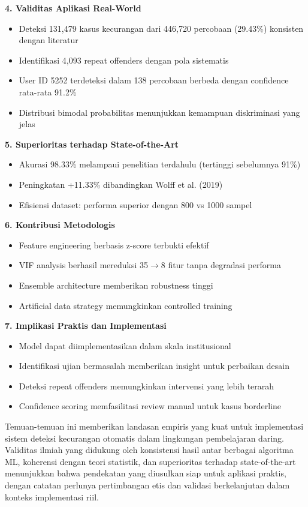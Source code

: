 \textbf{4. Validitas Aplikasi Real-World}
\begin{itemize}
    \item Deteksi 131,479 kasus kecurangan dari 446,720 percobaan (29.43\%) konsisten dengan literatur
    \item Identifikasi 4,093 repeat offenders dengan pola sistematis
    \item User ID 5252 terdeteksi dalam 138 percobaan berbeda dengan confidence rata-rata 91.2\%
    \item Distribusi bimodal probabilitas menunjukkan kemampuan diskriminasi yang jelas
\end{itemize}

\textbf{5. Superioritas terhadap State-of-the-Art}
\begin{itemize}
    \item Akurasi 98.33\% melampaui penelitian terdahulu (tertinggi sebelumnya 91\%)
    \item Peningkatan +11.33\% dibandingkan Wolff et al. (2019)
    \item Efisiensi dataset: performa superior dengan 800 vs 1000 sampel
\end{itemize}

\textbf{6. Kontribusi Metodologis}
\begin{itemize}
    \item Feature engineering berbasis z-score terbukti efektif
    \item VIF analysis berhasil mereduksi 35$\rightarrow$8 fitur tanpa degradasi performa
    \item Ensemble architecture memberikan robustness tinggi
    \item Artificial data strategy memungkinkan controlled training
\end{itemize}

\textbf{7. Implikasi Praktis dan Implementasi}
\begin{itemize}
    \item Model dapat diimplementasikan dalam skala institusional
    \item Identifikasi ujian bermasalah memberikan insight untuk perbaikan desain
    \item Deteksi repeat offenders memungkinkan intervensi yang lebih terarah
    \item Confidence scoring memfasilitasi review manual untuk kasus borderline
\end{itemize}

Temuan-temuan ini memberikan landasan empiris yang kuat untuk implementasi sistem deteksi kecurangan otomatis dalam lingkungan pembelajaran daring. Validitas ilmiah yang didukung oleh konsistensi hasil antar berbagai algoritma ML, koherensi dengan teori statistik, dan superioritas terhadap state-of-the-art menunjukkan bahwa pendekatan yang diusulkan siap untuk aplikasi praktis, dengan catatan perlunya pertimbangan etis dan validasi berkelanjutan dalam konteks implementasi riil. 